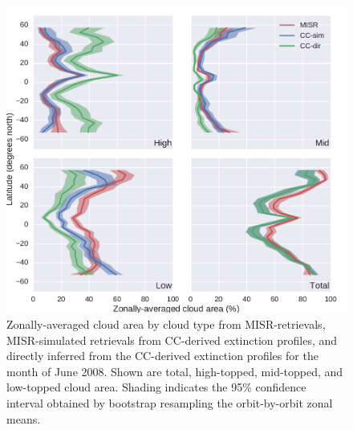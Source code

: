 \begin{figure}[htbp]
\centering
\includegraphics{graphics/misr_cldmisr_zonal_2008-06.pdf}
\caption{\label{fig:misr_cldmisr_zonal_jun}Zonally-averaged cloud area
by cloud type from MISR-retrievals, MISR-simulated retrievals from
CC-derived extinction profiles, and directly inferred from the
CC-derived extinction profiles for the month of June 2008. Shown are
total, high-topped, mid-topped, and low-topped cloud area. Shading
indicates the 95\% confidence interval obtained by bootstrap resampling
the orbit-by-orbit zonal
means.}\label{fig:misrux5fcldmisrux5fzonalux5fjun}
\end{figure}

